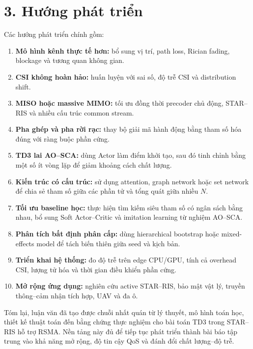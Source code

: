 \section*{3. Hướng phát triển}
Các hướng phát triển chính gồm:
\begin{enumerate}[label=\arabic*)]
  \item \textbf{Mô hình kênh thực tế hơn:} bổ sung vị trí, path loss, Rician fading, blockage và tương quan không gian.
  \item \textbf{CSI không hoàn hảo:} huấn luyện với sai số, độ trễ CSI và distribution shift.
  \item \textbf{MISO hoặc massive MIMO:} tối ưu đồng thời precoder chủ động, STAR--RIS và nhiều cấu trúc common stream.
  \item \textbf{Pha ghép và pha rời rạc:} thay bộ giải mã hành động bằng tham số hóa đúng với ràng buộc phần cứng.
  \item \textbf{TD3 lai AO--SCA:} dùng Actor làm điểm khởi tạo, sau đó tinh chỉnh bằng một số ít vòng lặp để giảm khoảng cách chất lượng.
  \item \textbf{Kiến trúc có cấu trúc:} sử dụng attention, graph network hoặc set network để chia sẻ tham số giữa các phần tử và tổng quát giữa nhiều $N$.
  \item \textbf{Tối ưu baseline học:} thực hiện tìm kiếm siêu tham số có ngân sách bằng nhau, bổ sung Soft Actor--Critic và imitation learning từ nghiệm AO--SCA.
  \item \textbf{Phân tích bất định phân cấp:} dùng hierarchical bootstrap hoặc mixed-effects model để tách biến thiên giữa seed và kịch bản.
  \item \textbf{Triển khai hệ thống:} đo độ trễ trên edge CPU/GPU, tính cả overhead CSI, lượng tử hóa và thời gian điều khiển phần cứng.
  \item \textbf{Mở rộng ứng dụng:} nghiên cứu active STAR--RIS, bảo mật vật lý, truyền thông--cảm nhận tích hợp, UAV và đa ô.
\end{enumerate}

Tóm lại, luận văn đã tạo được chuỗi nhất quán từ lý thuyết, mô hình toán học, thiết kế thuật toán đến bằng chứng thực nghiệm cho bài toán TD3 trong STAR--RIS hỗ trợ RSMA. Nền tảng này đủ để tiếp tục phát triển thành bài báo tập trung vào khả năng mở rộng, độ tin cậy QoS và đánh đổi chất lượng--độ trễ.
